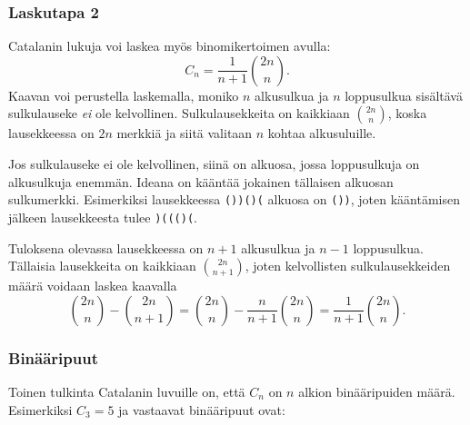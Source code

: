 \subsubsection{Laskutapa 2}

Catalanin lukuja voi laskea myös binomikertoimen avulla:
\[ C_n = \frac{1}{n+1} {2n \choose n}. \]
Kaavan voi perustella laskemalla, moniko $n$ alkusulkua
ja $n$ loppusulkua sisältävä sulkulauseke \textit{ei}
ole kelvollinen.
Sulkulausekkeita on kaikkiaan ${2n \choose n}$,
koska lausekkeessa on $2n$ merkkiä ja siitä valitaan
$n$ kohtaa alkusuluille.

Jos sulkulauseke ei ole kelvollinen,
siinä on alkuosa, jossa loppusulkuja on alkusulkuja
enemmän.
Ideana on kääntää jokainen tällaisen alkuosan
sulkumerkki.
Esimerkiksi lausekkeessa \texttt{())()(}
alkuosa on \texttt{())}, joten kääntämisen
jälkeen lausekkeesta tulee \texttt{)((()(}.

Tuloksena olevassa lausekkeessa on $n+1$ alkusulkua
ja $n-1$ loppusulkua. Tällaisia lausekkeita on
kaikkiaan ${2n \choose n+1}$, joten kelvollisten
sulkulausekkeiden määrä voidaan laskea kaavalla
\[{2n \choose n}-{2n \choose n+1} = {2n \choose n} - \frac{n}{n+1} {2n \choose n} = \frac{1}{n+1} {2n \choose n}.\]

\subsubsection{Binääripuut}

Toinen tulkinta Catalanin luvuille on,
että $C_n$ on $n$ alkion binääripuiden määrä.
Esimerkiksi $C_3=5$ ja vastaavat binääripuut ovat:

\begin{center}
\end{center}

